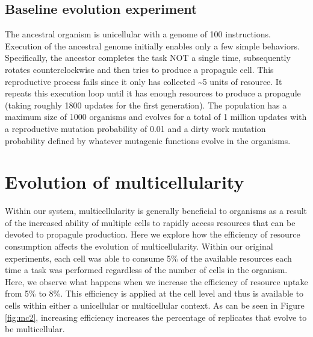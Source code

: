 \documentclass[
]{book}
\begin{document}
\hypertarget{baseline-evolution-experiment}{%
\subsection{Baseline evolution experiment}\label{baseline-evolution-experiment}}

The ancestral organism is unicellular with a genome of 100 instructions. Execution of the ancestral genome initially enables only a few simple behaviors. Specifically, the ancestor completes the task NOT a single time, subsequently rotates counterclockwise and then tries to produce a propagule cell. This reproductive process fails since it only has collected \textasciitilde5 units of resource. It repeats this execution loop until it has enough resources to produce a propagule (taking roughly 1800 updates for the first generation). The population has a maximum size of 1000 organisms and evolves for a total of 1 million updates with a reproductive mutation probability of 0.01 and a dirty work mutation probability defined by whatever mutagenic functions evolve in the organisms.

\hypertarget{evolution-of-multicellularity}{%
\section{Evolution of multicellularity}\label{evolution-of-multicellularity}}

Within our system, multicellularity is generally beneficial to organisms as a result of the increased ability of multiple cells to rapidly access resources that can be devoted to propagule production. Here we explore how the efficiency of resource consumption affects the evolution of multicellularity. Within our original experiments, each cell was able to consume 5\% of the available resources each time a task was performed regardless of the number of cells in the organism. Here, we observe what happens when we increase the efficiency of resource uptake from 5\% to 8\%. This efficiency is applied at the cell level and thus is available to cells within either a unicellular or multicellular context. As can be seen in Figure \ref{fig:mc2}, increasing efficiency increases the percentage of replicates that evolve to be multicellular.
\end{document}
